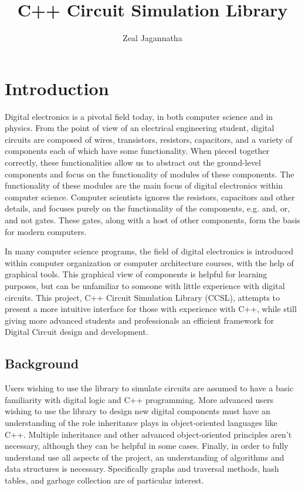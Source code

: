 \documentclass{article}
\begin{document}
\title{C++ Circuit Simulation Library}
\author{Zeal Jagannatha}

\maketitle

\section{Introduction}

Digital electronics is a pivotal field today, in both computer science and in physics. From the point of view of an electrical engineering student, digital circuits are composed of wires, transistors, resistors, capacitors, and a variety of components each of which have some functionality. When pieced together correctly, these functionalities allow us to abstract out the ground-level components and focus on the functionality of modules of these components. The functionality of these modules are the main focus of digital electronics within computer science. Computer scientists ignores the resistors, capacitors and other details, and focuses purely on the functionality of the components, e.g. and, or, and not gates. These gates, along with a host of other components, form the basis for modern computers.

In many computer science programs, the field of digital electronics is introduced within computer organization or computer architecture courses, with the help of graphical tools. This graphical view of components is helpful for learning purposes, but can be unfamiliar to someone with little experience with digital circuits. This project, C++ Circuit Simulation Library (CCSL), attempts to present a more intuitive interface for those with experience with C++, while still giving more advanced students and professionals an efficient framework for Digital Circuit design and development.

\subsection{Background}

Users wishing to use the library to simulate circuits are assumed to have a basic familiarity with digital logic and C++ programming. More advanced users wishing to use the library to design new digital components must have an understanding of the role inheritance plays in object-oriented languages like C++. Multiple inheritance and other advanced object-oriented principles aren’t necessary, although they can be helpful in some cases. Finally, in order to fully understand use all aspects of the project, an understanding of algorithms and data structures is necessary. Specifically graphs and traversal methods, hash tables, and garbage collection are of particular interest.
\end{document}
